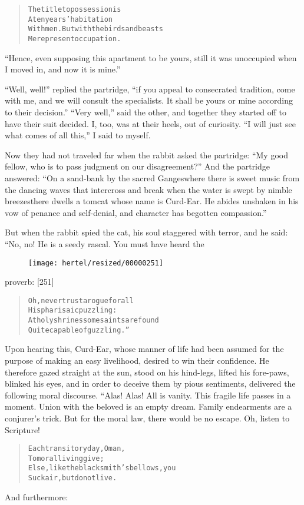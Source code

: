 \documentclass[article, twoside, 10pt]{memoir}
\renewenvironment{verbatim}{%
\begin{quote}%
\vskip -10pt%
\begin{alltt}\normalfont\small}{\end{alltt}%
\end{quote}%
\vskip -10pt
} %
\begin{document}
\begin{verbatim}
The title to possession is
    A ten years' habitation
With men. But with the birds and beasts
    Mere present occupation.
\end{verbatim}
``Hence, even supposing this apartment to be yours, still it was unoccupied when I moved in, and now it is mine.''

``Well, well!'' replied the partridge,
``if you appeal to consecrated tradition, come with me, and we will consult the specialists. It shall be yours or mine according to their decision.''
``Very well,'' said the other, and together they started off to
have their suit decided. I, too, was at their heels, out of
curiosity. ``I will just see what comes of all this,'' I said to
myself.

Now they had not traveled far when the rabbit asked the partridge:
``My good fellow, who is to pass judgment on our disagreement?''
And the partridge answered:
``On a sand-bank by the sacred Ganges{\textemdash}where there is sweet music from the dancing waves that intercross and break when the water is swept by nimble breezes{\textemdash}there dwells a tomcat whose name is Curd-Ear. He abides unshaken in his vow of penance and self-denial, and character has begotten compassion.''

But when the rabbit spied the cat, his soul staggered with terror,
and he said: “No, no! He is a seedy rascal. You must have heard the
\begin{figure}[p]\texttt{[image: hertel/resized/00000251]}\end{figure}proverb: [251]

\begin{verbatim}
Oh, never trust a rogue for all
    His pharisaic puzzling:
At holy shrines some saints are found
    Quite capable of guzzling.”
\end{verbatim}
Upon hearing this, Curd-Ear, whose manner of life had been assumed
for the purpose of making an easy livelihood, desired to win their
confidence. He therefore gazed straight at the sun, stood on his
hind-legs, lifted his fore-paws, blinked his eyes, and in order to
deceive them by pious sentiments, delivered the following moral
discourse. “Alas! Alas! All is vanity. This fragile life passes in
a moment. Union with the beloved is an empty dream. Family
endearments are a conjurer's trick. But for the moral law, there
would be no escape. Oh, listen to Scripture!

\begin{verbatim}
Each transitory day, O man,
    To moral living give;
Else, like the blacksmith's bellows, you
    Suck air, but do not live.
\end{verbatim}
And furthermore:
\end{document}
